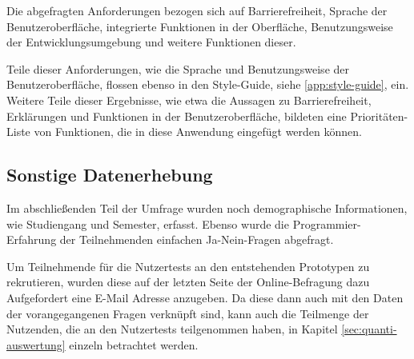 Die abgefragten Anforderungen bezogen sich auf Barrierefreiheit, Sprache der Benutzeroberfläche, integrierte Funktionen in der Oberfläche, Benutzungsweise der Entwicklungsumgebung und weitere Funktionen dieser.

Teile dieser Anforderungen, wie die Sprache und Benutzungsweise der Benutzeroberfläche, flossen ebenso in den Style-Guide, siehe \ref{app:style-guide}, ein. Weitere Teile dieser Ergebnisse, wie etwa die Aussagen zu Barrierefreiheit, Erklärungen und Funktionen in der Benutzeroberfläche, bildeten eine Prioritäten-Liste von Funktionen, die in diese Anwendung eingefügt werden können.

%
%

\subsection{Sonstige Datenerhebung}
Im abschließenden Teil der Umfrage wurden noch demographische Informationen, wie Studiengang und Semester, erfasst. Ebenso wurde die Programmier-Erfahrung der Teilnehmenden einfachen Ja-Nein-Fragen abgefragt.

Um Teilnehmende für die Nutzertests an den entstehenden Prototypen zu rekrutieren, wurden diese auf der letzten Seite der Online-Befragung dazu Aufgefordert eine E-Mail Adresse anzugeben. Da diese dann auch mit den Daten der vorangegangenen Fragen verknüpft sind, kann auch die Teilmenge der Nutzenden, die an den Nutzertests teilgenommen haben, in Kapitel \ref{sec:quanti-auswertung} einzeln betrachtet werden.

